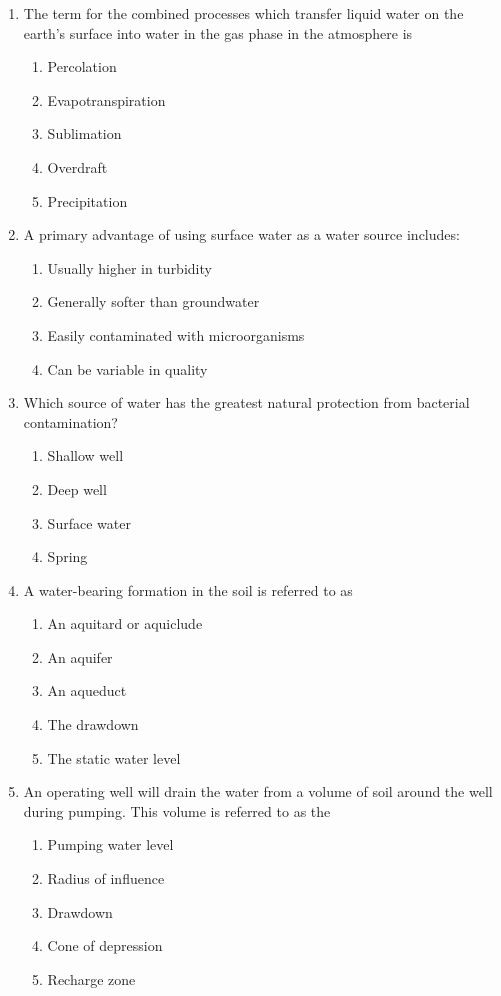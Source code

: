 \begin{enumerate}
\item The term for the combined processes which transfer liquid water on the earth's surface into water in the gas phase in the atmosphere is
\begin{enumerate}
\item Percolation
\item Evapotranspiration
\item Sublimation
\item Overdraft
\item Precipitation
\end{enumerate}

\item A primary advantage of using surface water as a water source includes:
\begin{enumerate}
\item Usually higher in turbidity
\item Generally softer than groundwater
\item Easily contaminated with microorganisms
\item Can be variable in quality
\end{enumerate}

\item Which source of water has the greatest natural protection from bacterial contamination?
\begin{enumerate}
\item Shallow well
\item Deep well
\item Surface water
\item Spring
\end{enumerate}

\item A water-bearing formation in the soil is referred to as
\begin{enumerate}
\item An aquitard or aquiclude
\item An aquifer
\item An aqueduct
\item The drawdown
\item The static water level
\end{enumerate}

\item An operating well will drain the water from a volume of soil around the well during pumping. This volume is referred to as the
\begin{enumerate}
\item Pumping water level
\item Radius of influence
\item Drawdown
\item Cone of depression
\item Recharge zone
\end{enumerate}


\end{enumerate}
